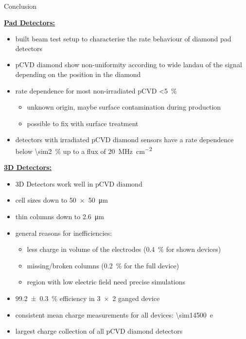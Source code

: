 \begin{block}{Conclusion}
	
	\textbf{\underline{Pad Detectors:}}\vspace*{2ex}
	\begin{itemize}
		\item built beam test setup to characterise the rate behaviour of diamond pad detectors
		\item pCVD diamond show non-uniformity according to wide landau of the signal depending on the position in the diamond
		\item rate dependence for most non-irradiated pCVD \SI{<5}{\%}
		\begin{itemize}
			\item unknown origin, maybe surface contamination during production
			\item possible to fix with surface treatment
		\end{itemize}
		\item detectors with irradiated pCVD diamond sensors have a rate dependence below \SI{\sim2}{\%} up to a flux of \SI{20}{\mega\hertz\per \centi\meter^2}
	\end{itemize}\vspace*{2ex}
	
	\textbf{\underline{3D Detectors:}}\vspace*{1ex}
	\begin{itemize}
		\item 3D Detectors work well in pCVD diamond
		\item cell sizes down to \SI{50x50}{\micro\meter}
		\item thin columns down to \SI{2.6}{\micro\meter}
		\item general reasons for inefficiencies:
		\begin{itemize}
			\item less charge in volume of the electrodes (\SI{.4}{\%} for shown devices)
			\item missing/broken columns (\SI{.2}{\%} for the full device)
			\item region with low electric field \ra need precise simulations
		\end{itemize}
		\item \SI{99.2\pm .3}{\%} efficiency in \SI{3x2}{} ganged device
		\item consistent mean charge measurements for all devices: \SI{\sim14500}{e}
		\item largest charge collection of all pCVD diamond detectors
	\end{itemize}

	
\end{block}
